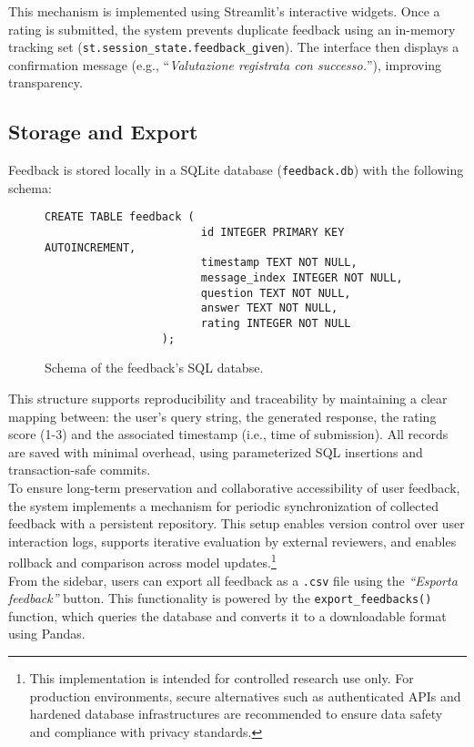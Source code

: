 \begin{spacing}{1.5}
This mechanism is implemented using Streamlit’s interactive widgets. Once a rating is submitted, the system prevents duplicate feedback using an in-memory tracking set (\texttt{st.session\_state.feedback\_given}). The interface then displays a confirmation message (e.g., ``\textit{Valutazione registrata con successo.}''), improving transparency.

\subsection{Storage and Export}
Feedback is stored locally in a SQLite database (\texttt{feedback.db}) with the following schema:

\begin{figure}[H]
\begin{Verbatim}[breaklines=true]
                  CREATE TABLE feedback (
                        id INTEGER PRIMARY KEY AUTOINCREMENT,
                        timestamp TEXT NOT NULL,
                        message_index INTEGER NOT NULL,
                        question TEXT NOT NULL,
                        answer TEXT NOT NULL,
                        rating INTEGER NOT NULL
                  );
\end{Verbatim}
\caption{Schema of the feedback's SQL databse.}\label{fig:sql_schema}
\end{figure}

This structure supports reproducibility and traceability by maintaining a clear mapping between: the user's query string, the generated response, the rating score (1-3) and the associated timestamp (i.e., time of submission). All records are saved with minimal overhead, using parameterized SQL insertions and transaction-safe commits.\\

To ensure long-term preservation and collaborative accessibility of user feedback, the system implements a mechanism for periodic synchronization of collected feedback with a persistent repository. This setup enables version control over user interaction logs, supports iterative evaluation by external reviewers, and enables rollback and comparison across model updates.\footnote{This implementation is intended for controlled research use only. For production environments, secure alternatives such as authenticated APIs and hardened database infrastructures are recommended to ensure data safety and compliance with privacy standards.}\\

From the sidebar, users can export all feedback as a \texttt{.csv} file using the \textit{``Esporta feedback''} button. This functionality is powered by the \texttt{export\_feedbacks()} function, which queries the database and converts it to a downloadable format using Pandas. 


\end{spacing}
